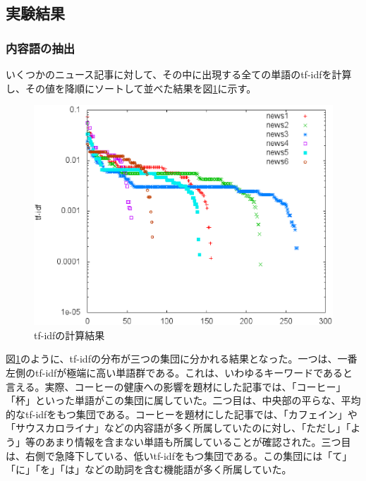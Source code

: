 \documentclass[12pt]{jarticle}
\begin{document}
\subsection{実験結果}
\subsubsection{内容語の抽出}

いくつかのニュース記事に対して、その中に出現する全ての単語のtf-idfを計算し、その値を降順にソートして並べた結果を図\ref{content_word}に示す。

\begin{figure}[htbp]
  \begin{center}
    \includegraphics[scale = 0.5]{image/content_word.eps}
  \end{center}
  \label{content_word}
  \caption{tf-idfの計算結果}

\end{figure}

図\ref{content_word}のように、tf-idfの分布が三つの集団に分かれる結果となった。一つは、一番左側のtf-idfが極端に高い単語群である。これは、いわゆるキーワードであると言える。実際、コーヒーの健康への影響を題材にした記事では、「コーヒー」「杯」といった単語がこの集団に属していた。二つ目は、中央部の平らな、平均的なtf-idfをもつ集団である。コーヒーを題材にした記事では、「カフェイン」や「サウスカロライナ」などの内容語が多く所属していたのに対し、「ただし」「よう」等のあまり情報を含まない単語も所属していることが確認された。三つ目は、右側で急降下している、低いtf-idfをもつ集団である。この集団には「て」「に」「を」「は」などの助詞を含む機能語が多く所属していた。
\end{document}
